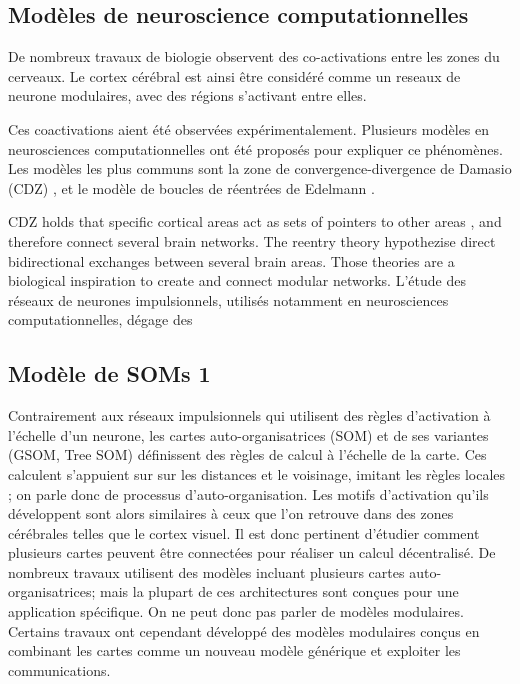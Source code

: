 \subsection{Modèles de neuroscience computationnelles}

De nombreux travaux de biologie observent des co-activations entre les zones du cerveaux. Le cortex cérébral est ainsi être considéré comme un reseaux de neurone modulaires, avec des régions s'activant entre elles. \cite{primate_cortex_91,mountcastle_columnar_1997,Harriger2012RichCO}

Ces coactivations aient été observées expérimentalement. Plusieurs modèles en neurosciences computationnelles ont été proposés pour expliquer ce phénomènes. Les modèles les plus communs sont la zone de convergence-divergence de Damasio (CDZ) \cite{damasio_time-locked_1989}, et le modèle de boucles de réentrées de Edelmann \cite{Edelman1982GroupSA}.

CDZ holds that specific cortical areas act as sets of pointers to other areas , and therefore connect several brain networks. The reentry theory hypothezise direct bidirectional exchanges between several brain areas. Those theories are a biological inspiration to create and connect modular networks.
L'étude des réseaux de neurones impulsionnels, utilisés notamment en neurosciences computationnelles, dégage des 
\cite{electronics9101605}

\subsection{Modèle de SOMs 1}
Contrairement aux réseaux impulsionnels qui utilisent des règles d'activation à l'échelle d'un neurone, les cartes auto-organisatrices (SOM) et de ses variantes (GSOM, Tree SOM) définissent des règles de calcul à l'échelle de la carte. Ces calculent s'appuient sur sur les distances et le voisinage, imitant les règles locales ; on parle donc de processus d'auto-organisation. Les motifs d'activation qu'ils développent sont alors similaires à ceux que l'on retrouve dans des zones cérébrales telles que le cortex visuel.
Il est donc pertinent d'étudier comment plusieurs cartes peuvent être connectées pour réaliser un calcul décentralisé.
De nombreux travaux utilisent des modèles incluant plusieurs cartes auto-organisatrices; mais la plupart de ces architectures sont conçues pour une application spécifique.
On ne peut donc pas parler de modèles modulaires. Certains travaux ont cependant développé des modèles modulaires conçus en combinant les cartes comme un nouveau modèle générique et exploiter les communications.


